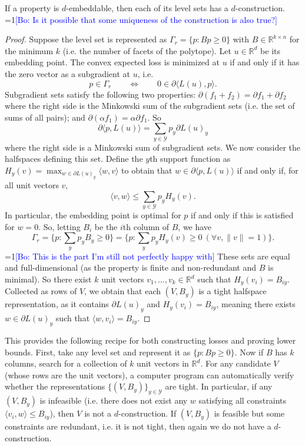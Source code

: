 \documentclass[11pt]{colt2019}
\newcommand{\Comments}{1}
\newcommand{\mynote}[2]{\ifnum\Comments=1\textcolor{#1}{#2}\fi}
\newcommand{\bo}[1]{\mynote{blue}{[Bo: #1]}}
\newcommand{\reals}{\mathbb{R}}
\newcommand{\Y}{\mathcal{Y}}
\begin{document}
\begin{corollary}
  If a property is $d$-embeddable, then each of its level sets has a $d$-construction.
  \bo{Is it possible that some uniqueness of the construction is also true?}
\end{corollary}
\begin{proof}
  Suppose the level set is represented as $\Gamma_r = \{p : Bp \geq 0\}$ with $B \in \reals^{k \times n}$ for the minimum $k$ (i.e. the number of facets of the polytope).
  Let $u \in \reals^d$ be its embedding point.
  The convex expected loss is minimized at $u$ if and only if it has the zero vector as a subgradient at $u$, i.e.
    \[ p \in \Gamma_r \qquad \iff \qquad 0 \in \partial \langle L(u), p \rangle . \]
  Subgradient sets satisfy the following two properties: $\partial(f_1 + f_2) = \partial f_1 + \partial f_2$ where the right side is the Minkowski sum of the subgradient sets (i.e. the set of sums of all pairs); and $\partial(\alpha f_1) = \alpha \partial f_1$.
  So
    \[ \partial \langle p , L(u) \rangle = \sum_{y \in \Y} p_y \partial L(u)_y \]
  where the right side is a Minkowski sum of subgradient sets.
  We now consider the halfspaces defining this set.
  Define the $y$th support function as $H_y(v) = \max_{w \in \partial L(u)_y} \langle w, v \rangle$ to obtain that $w \in \partial \langle p, L(u) \rangle$ if and only if, for all unit vectors $v$,
   \[ \langle v, w \rangle \leq \sum_{y \in \Y} p_y H_y(v) . \]
  In particular, the embedding point is optimal for $p$ if and only if this is satisfied for $w=0$.
  So, letting $B_i$ be the $i$th column of $B$, we have
    \[ \Gamma_r = \{p : \sum_y p_y B_y \geq 0\} = \{p : \sum_y p_y H_y(v) \geq 0 ~ (\forall v, \|v\|=1)\} . \]
  \bo{This is the part I'm still not perfectly happy with}
  These sets are equal and full-dimensional (as the property is finite and non-redundant and $B$ is minimal).
  So there exist $k$ unit vectors $v_1,\dots,v_k \in \reals^d$ such that $H_y(v_i) = B_{iy}$.
  Collected as rows of $V$, we obtain that each $(V,B_y)$ is a tight halfspace representation, as it contains $\partial L(u)_y$ and $H_y(v_i) = B_{iy}$, meaning there exists $w \in \partial L(u)_y$ such that $\langle w, v_i \rangle = B_{iy}$.
\end{proof}
This provides the following recipe for both constructing losses and proving lower bounds.
First, take any level set and represent it as $\{p : Bp \geq 0\}$.
Now if $B$ has $k$ columns, search for a collection of $k$ unit vectors in $\reals^d$.
For any candidate $V$ (whose rows are the unit vectors), a computer program can automatically verify whether the representations $\{(V,B_y)\}_{y \in \Y}$ are tight.
In particular, if any $(V,B_y)$ is infeasible (i.e. there does not exist any $w$ satisfying all constraints $\langle v_i, w \rangle \leq B_{iy}$), then $V$ is not a $d$-construction.
If $(V,B_y)$ is feasible but some constraints are redundant, i.e. it is not tight, then again we do not have a $d$-construction.
\end{document}
